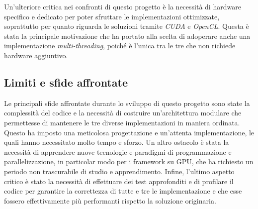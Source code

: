 Un'ulteriore critica nei confronti di questo progetto è la necessità di hardware
specifico e dedicato per poter sfruttare le implementazioni ottimizzate,
soprattutto per quanto riguarda le soluzioni tramite \textit{CUDA} e \textit{OpenCL}.
Questa è stata la principale motivazione che ha portato alla scelta di adoperare
anche una implementazione \textit{multi-threading}, poiché è l'unica tra le tre che
non richiede hardware aggiuntivo.

\subsection{Limiti e sfide affrontate}
\label{subsec:limiti}

Le principali sfide affrontate durante lo sviluppo di questo progetto sono state
la complessità del codice e la necessità di costruire un'architettura modulare
che permettesse di mantenere le tre diverse implementazioni in maniera ordinata.
Questo ha imposto una meticolosa progettazione e un'attenta implementazione, le
quali hanno necessitato molto tempo e sforzo. Un altro ostacolo è stata la necessità
di apprendere nuove tecnologie e paradigmi di programmazione e parallelizzazione,
in particolar modo per i framework su GPU, che ha richiesto un periodo non trascurabile
di studio e apprendimento. Infine, l'ultimo aspetto critico è stato la necessità
di effettuare dei test approfonditi e di profilare il codice per garantire la correttezza
di tutte e tre le implementazione e che esse fossero effettivamente più performanti
rispetto la soluzione originaria.